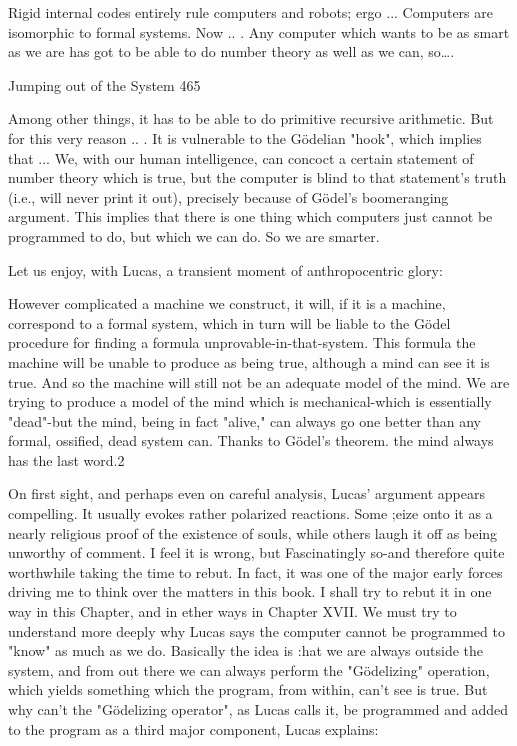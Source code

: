 {       Rigid internal codes entirely rule computers and robots; ergo ...
       Computers are isomorphic to formal systems. Now .. .
       Any computer which wants to be as smart as we are has got to be able to do
       number theory as well as we can, so….




Jumping out of the System                                                               465

       Among other things, it has to be able to do primitive recursive arithmetic. But for
          this very reason .. .
       It is vulnerable to the Gödelian "hook", which implies that ...
       We, with our human intelligence, can concoct a certain statement of number
          theory which is true, but the computer is blind to that statement's truth (i.e., will
          never print it out), precisely because of Gödel’s boomeranging argument.
       This implies that there is one thing which computers just cannot be programmed
          to do, but which we can do. So we are smarter.

Let us enjoy, with Lucas, a transient moment of anthropocentric glory:

  However complicated a machine we construct, it will, if it is a machine, correspond
  to a formal system, which in turn will be liable to the Gödel procedure for finding a
  formula unprovable-in-that-system. This formula the machine will be unable to
  produce as being true, although a mind can see it is true. And so the machine will
  still not be an adequate model of the mind. We are trying to produce a model of the
  mind which is mechanical-which is essentially "dead"-but the mind, being in fact
  "alive," can always go one better than any formal, ossified, dead system can. Thanks
  to Gödel’s theorem. the mind always has the last word.2

   On first sight, and perhaps even on careful analysis, Lucas' argument appears
compelling. It usually evokes rather polarized reactions. Some ;eize onto it as a nearly
religious proof of the existence of souls, while others laugh it off as being unworthy of
comment. I feel it is wrong, but Fascinatingly so-and therefore quite worthwhile taking
the time to rebut. In fact, it was one of the major early forces driving me to think over the
matters in this book. I shall try to rebut it in one way in this Chapter, and in ether ways in
Chapter XVII.
   We must try to understand more deeply why Lucas says the computer cannot be
programmed to "know" as much as we do. Basically the idea is :hat we are always
outside the system, and from out there we can always perform the "Gödelizing"
operation, which yields something which the program, from within, can't see is true. But
why can't the "Gödelizing operator", as Lucas calls it, be programmed and added to the
program as a third major component, Lucas explains:

}
